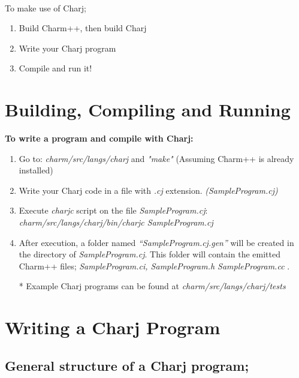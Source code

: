 \documentclass[11pt]{article}
\begin{document}
\begin{verbatim}


\end{verbatim}

To make use of Charj;
\begin{enumerate}
\item Build Charm++, then build Charj
\item Write your Charj program
\item Compile and run it!
\end{enumerate}

\section{Building, Compiling and Running}
{\bf To write a program and compile with Charj:}

\begin{enumerate}
\item Go to: {\it charm/src/langs/charj} and {\it "make" } (Assuming Charm++ is already installed)
\item Write your Charj code in a file with {\it .cj} extension. {\it (SampleProgram.cj)}
\item Execute {\it charjc} script on the file {\it SampleProgram.cj}: \\ {\it charm/src/langs/charj/bin/charjc  SampleProgram.cj}
\item After execution, a folder named {\it“SampleProgram.cj.gen”} will be created in the directory of {\it SampleProgram.cj}. This folder will contain the emitted Charm++ files; {\it SampleProgram.ci, SampleProgram.h SampleProgram.cc }.

* Example Charj programs can be found at {\it charm/src/langs/charj/tests}
\end{enumerate}


\section{Writing a Charj Program}

\subsection{General structure of a Charj program; }
\end{document}
